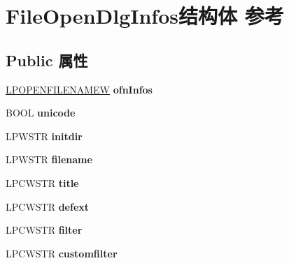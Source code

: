 \hypertarget{struct_file_open_dlg_infos}{}\section{File\+Open\+Dlg\+Infos结构体 参考}
\label{struct_file_open_dlg_infos}
\subsection*{Public 属性}
\begin{DoxyCompactItemize}
\item 
\mbox{\label{struct_file_open_dlg_infos_a704b404f71c14b9a4370b0dd3899923a}} 
\hyperlink{structtag_o_f_n_w}{L\+P\+O\+P\+E\+N\+F\+I\+L\+E\+N\+A\+M\+EW} {\bfseries ofn\+Infos}
\item 
\mbox{\label{struct_file_open_dlg_infos_ae12f17a5e6bfe782f6964fc8570efef8}} 
B\+O\+OL {\bfseries unicode}
\item 
\mbox{\label{struct_file_open_dlg_infos_a288fdc60fd06da40dd1627e2a1dcda12}} 
L\+P\+W\+S\+TR {\bfseries initdir}
\item 
\mbox{\label{struct_file_open_dlg_infos_a64701b4d1eb3fe906ce664906eb1d92c}} 
L\+P\+W\+S\+TR {\bfseries filename}
\item 
\mbox{\label{struct_file_open_dlg_infos_ac69a4d30b11a70deda980639f19f3d68}} 
L\+P\+C\+W\+S\+TR {\bfseries title}
\item 
\mbox{\label{struct_file_open_dlg_infos_a747512b996fe748325fa2688bac05695}} 
L\+P\+C\+W\+S\+TR {\bfseries defext}
\item 
\mbox{\label{struct_file_open_dlg_infos_ae46cebf607d509d137f54d5b2402a56f}} 
L\+P\+C\+W\+S\+TR {\bfseries filter}
\item 
\mbox{\label{struct_file_open_dlg_infos_aea6aa63586419fa1fa9bf3dcf02c78be}} 
L\+P\+C\+W\+S\+TR {\bfseries customfilter}
\item 
\mbox{\label{struct_file_open_dlg_infos_af848306547493578c8c8ebf548c2a58e}} 

\end{DoxyCompactItemize}
